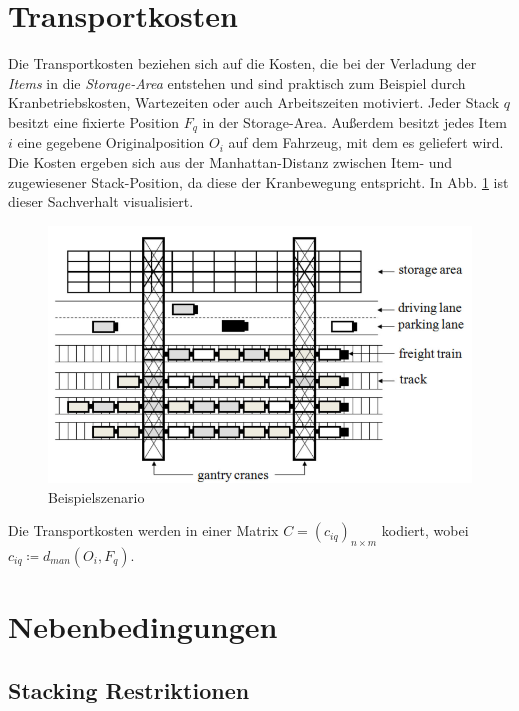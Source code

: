 \section{Transportkosten}
\label{sec:transport_costs}
Die Transportkosten beziehen sich auf die Kosten, die bei der Verladung der \textit{Items} in die \textit{Storage-Area} entstehen
und sind praktisch zum Beispiel durch Kranbetriebskosten, Wartezeiten oder auch Arbeitszeiten motiviert.\newline
Jeder Stack $q$ besitzt eine fixierte Position $F_q$ in der Storage-Area. Außerdem besitzt jedes Item $i$ eine gegebene
Originalposition $O_i$ auf dem Fahrzeug, mit dem es geliefert wird. Die Kosten ergeben sich aus der Manhattan-Distanz zwischen
Item- und zugewiesener Stack-Position, da diese der Kranbewegung entspricht. In Abb. \ref{fig:costs} ist dieser Sachverhalt visualisiert.
\begin{figure}[H]
\includegraphics[width=\textwidth]{img/costs.png}
\caption{Beispielszenario}
\label{fig:costs}
\end{figure}
Die Transportkosten werden in einer Matrix $C = (c_{iq})_{n \times m}$ kodiert, \newline wobei $c_{iq} \coloneqq d_{man}(O_i, F_q)$.

\pagebreak

\section{Nebenbedingungen}
\label{sec:constraints}

\subsection{Stacking Restriktionen}
\label{sec:stacking_restrictions}

